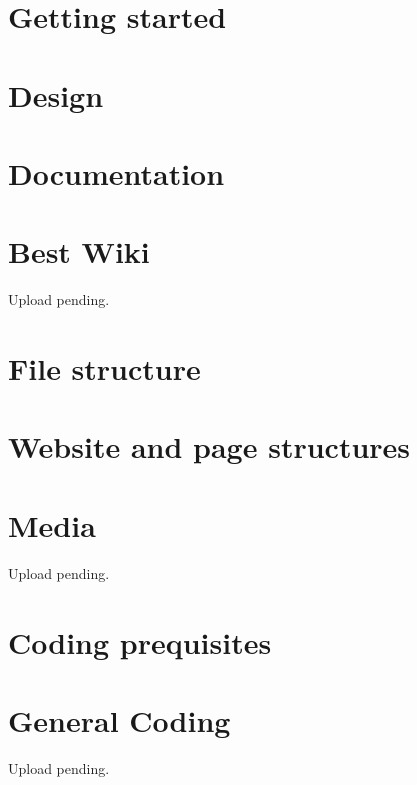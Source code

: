\documentclass[a4paper, 11pt, twoside]{book}
\begin{document}
\mainmatter
\pagecolor{pgcolor}
\chapter{Getting started} \label{ch:started}

\newpage
%
\chapter{Design} \label{ch:design}

\newpage
\chapter{Documentation} \label{ch:docu}

\newpage
%
\chapter{Best Wiki} \label{ch:bestwiki}
%
Upload pending. %
\newpage
\chapter{File structure} \label{ch:structure}

\newpage
%
\chapter{Website and page structures} \label{ch:webstructure}

\newpage
%
\chapter{Media}\label{ch:media}
Upload pending. %
%
\newpage
%
\chapter{Coding prequisites} \label{ch:prequisites}

\newpage
%
\chapter{General Coding}  \label{ch:coding}
Upload pending. %
%
\newpage
%
\end{document}
